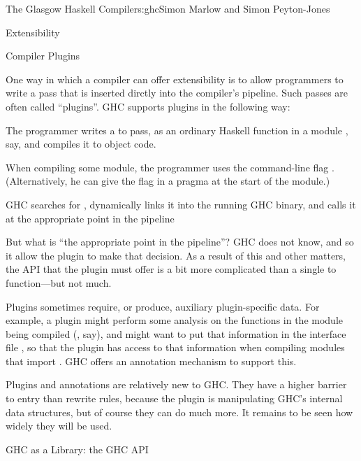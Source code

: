 \begin{aosachapter}{The Glasgow Haskell Compiler}{s:ghc}{Simon Marlow and Simon Peyton-Jones}
\begin{aosasect1}{Extensibility}
\begin{aosasect2}{User-Defined Rewrite Rules}
{\end{aosasect2}

\begin{aosasect2}{Compiler Plugins}

One way in which a compiler can offer extensibility is to allow
programmers to write a pass that is inserted dirctly into the
compiler's pipeline.  Such passes are often called ``plugins''.  GHC
supports plugins in the following way:

\begin{aosaitemize}

\item The programmer writes a \Core{} to \Core{} pass, as an ordinary
  Haskell function in a module , say, and compiles it to
  object code.

\item When compiling some module, the programmer uses the command-line
  flag .  (Alternatively, he can give the flag in a
  pragma at the start of the module.)

\item GHC searches for , dynamically links it into the
  running GHC binary, and calls it at the appropriate point in the
  pipeline

\end{aosaitemize}

But what is ``the appropriate point in the pipeline''?  GHC does not
know, and so it allow the plugin to make that decision.  As a result
of this and other matters, the API that the plugin must offer is a bit
more complicated than a single \Core{} to \Core{} function---but not
much.

Plugins sometimes require, or produce, auxiliary plugin-specific data.
For example, a plugin might perform some analysis on the functions in
the module being compiled (, say), and might want to put
that information in the interface file , so that the plugin
has access to that information when compiling modules that import
.  GHC offers an annotation mechanism to support this.

Plugins and annotations are relatively new to GHC.  They have a higher
barrier to entry than rewrite rules, because the plugin is
manipulating GHC's internal data structures, but of course they can do
much more.  It remains to be seen how widely they will be used.

\end{aosasect2}

\begin{aosasect2}{GHC as a Library: the GHC API}
\label{s:ghcapi}


\end{aosasect2}
\end{aosasect1}
\end{aosachapter}
